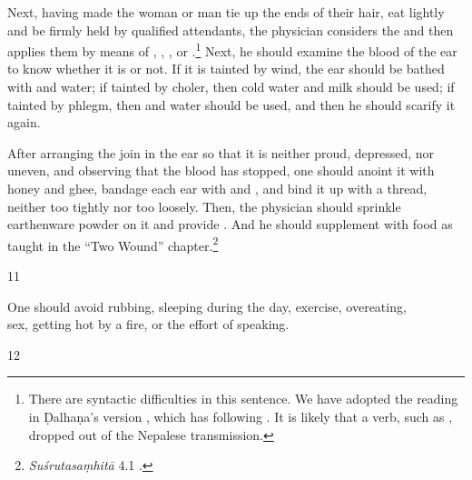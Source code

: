\begin{translation}
Next, having made the woman or man tie up the ends of their hair, eat lightly and
be firmly held by qualified attendants, the physician considers the
 and then applies them by means of ,
, , or
.\footnote{There are syntactic difficulties in this
    sentence.  We have %
    adopted the reading in Ḍalhaṇa's version \citep[78]{vulgate}, which has
     following . It is likely that a verb, such
    as , dropped out of the Nepalese transmission.}  Next, he should
    examine the blood of the ear to know whether it is  or not.
    If it is tainted by wind, the ear should be bathed with
     and water; if tainted by choler, then
    cold water and milk should be used; if tainted by phlegm, then
     and water should be used, and then he should
    scarify it again.
       
After arranging the join in the ear so that it is neither proud, depressed, nor
uneven, and observing that the blood has stopped, one should anoint it with
honey and ghee, bandage each ear with  and , and
bind it up with a thread, neither too tightly nor too loosely.  Then, the
physician should sprinkle earthenware powder on it and  provide
. And he should supplement with food as taught in  the
“Two Wound” chapter.\footnote{\emph{Suśrutasaṃhitā} 4.1 \citep[396–408]{vulgate}.}
    
\item[11]
\begin{sloka}
        One should avoid rubbing, sleeping during the day, exercise, overeating,\\
        sex, getting hot by a fire, or the effort of speaking.
    \end{sloka}

\item[12]
    

\end{translation}
